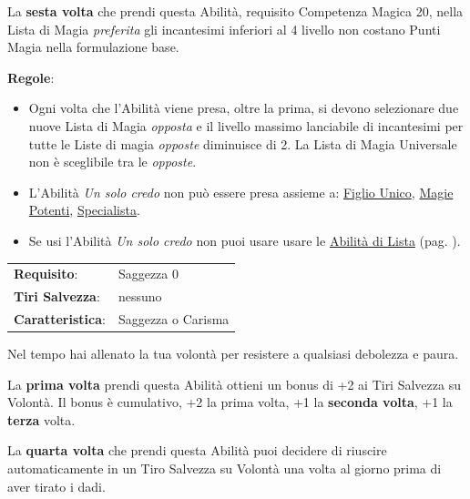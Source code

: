 \begin{multicols}{2}
La \textbf{sesta volta} che prendi questa Abilità, requisito Competenza Magica 20, nella Lista di Magia \emph{preferita} gli incantesimi inferiori al 4 livello non costano Punti Magia nella formulazione base.

\medskip

\textbf{Regole}:

\smallskip

\begin{itemize}[leftmargin=*] \setlength{\itemsep}{0pt}
\item Ogni volta che l'Abilità viene presa, oltre la prima, si devono selezionare due nuove Lista di Magia \emph{opposta} e il livello massimo lanciabile di incantesimi per tutte le Liste di magia \emph{opposte} diminuisce di 2.  La Lista di Magia Universale non è sceglibile tra le \emph{opposte}.

\item L'Abilità \emph{Un solo credo} non può essere presa assieme a: \hyperlink{figliounico}{Figlio Unico}, \hyperlink{magiepotenti}{Magie Potenti}, \hyperlink{specialista}{Specialista}.

\item Se usi l'Abilità \emph{Un solo credo} non puoi usare usare le \hyperlink{abilitadilista}{Abilità di Lista} (pag. \pageref{abilitadilista}).
\end{itemize}

\noindent\begin{tabularx}{\linewidth}{>{\raggedright\arraybackslash}p{2.5cm}X}
\rowcolor{gray!20}\textbf{Requisito}: & Saggezza 0\\
\textbf{Tiri Salvezza}: & nessuno\\
\rowcolor{gray!20}\textbf{Caratteristica}: & Saggezza o Carisma\\
\end{tabularx}\smallskip

Nel tempo hai allenato la tua volontà per resistere a qualsiasi debolezza e paura.

La \textbf{prima volta} prendi questa Abilità ottieni un bonus di +2 ai Tiri Salvezza su Volontà. Il bonus è cumulativo, +2 la prima volta, +1 la \textbf{seconda volta}, +1 la \textbf{terza} volta.

La \textbf{quarta volta} che prendi questa Abilità puoi decidere di riuscire automaticamente in un Tiro Salvezza su Volontà una volta al giorno prima di aver tirato i dadi.


\end{multicols}
